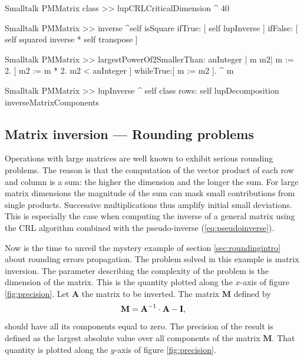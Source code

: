 \begin{displaycode}{Smalltalk}
PMMatrix class >> lupCRLCriticalDimension
    ^ 40
\end{displaycode}

\begin{displaycode}{Smalltalk}
PMMatrix >> inverse
    ^self isSquare 
        ifTrue: [ self lupInverse ]
        ifFalse: [ self squared inverse * self transpose ]
\end{displaycode}

\begin{displaycode}{Smalltalk}
PMMatrix >> largestPowerOf2SmallerThan: anInteger
    | m m2|
    m := 2.
    [ m2 := m * 2.
      m2 < anInteger ] whileTrue:[ m := m2 ].
    ^ m
\end{displaycode}

\begin{displaycode}{Smalltalk}
PMMatrix >> lupInverse
    ^ self class rows: self lupDecomposition inverseMatrixComponents
\end{displaycode}

\subsection{Matrix inversion --- Rounding problems}
\label{sec:matrixrounding} Operations with large matrices are well
known to exhibit serious rounding problems. The reason is that the
computation of the vector product of each row and column is a sum:
the higher the dimension and the longer the sum. For large matrix
dimensions the magnitude of the sum can mask small contributions
from single products. Successive multiplications thus amplify
initial small deviations. This is especially the case when
computing the inverse of a general matrix using the CRL algorithm
combined with the pseudo-inverse (\ref{eq:pseudoinverse}).

Now is the time to unveil the mystery example of section
\ref{sec:roundingintro} about rounding errors propagation. The
problem solved in this example is matrix inversion. The parameter
describing the complexity of the problem is the dimension of the
matrix. This is the quantity plotted along the $x$-axis of figure
\ref{fig:precision}. Let $\textbf{A}$ the matrix to be inverted. The
matrix $\textbf{M}$ defined by
\begin{equation}
  \textbf{M}=\textbf{A}^{-1}\cdot\textbf{A}-\textbf{I},
\end{equation}
should have all its components equal to zero. The precision of the
result is defined as the largest absolute value over all
components of the matrix $\textbf{M}$. That quantity is plotted along
the $y$-axis of figure \ref{fig:precision}.


